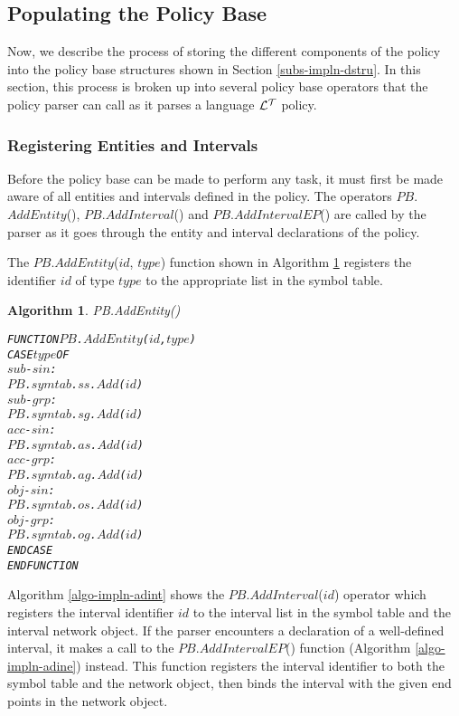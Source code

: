 \documentclass[11pt]{report}
\newenvironment{vverbatim}
{
  \begin{alltt}
}
{
    \vspace{-\baselineskip}
  \end{alltt}
}
\newtheorem{vvalgorithm}{Algorithm}[chapter]
\newenvironment{valgorithm}[2]
{
  \begin{vvalgorithm}{#1}
    \label{#2}
    \small
    \begin{vverbatim}
}
{
    \end{vverbatim}
  \end{vvalgorithm}
}
\begin{document}
      \subsection{Populating the Policy Base}
        \label{subs-impln-poppb}

        Now, we describe the process of storing the different components of the
        policy into the policy base structures shown in Section
        \ref{subs-impln-dstru}. In this section, this process is broken up into
        several policy base operators that the policy parser can call as it
        parses a language ${\cal L^T}$ policy.

        \subsubsection{Registering Entities and Intervals}

          Before the policy base can be made to perform any task, it must first
          be made aware of all entities and intervals defined in the policy.
          The operators $PB$.$AddEntity$(), $PB$.$AddInterval$() and
          $PB$.$AddIntervalEP$() are called by the parser as it goes through
          the entity and interval declarations of the policy.

          The $PB$.$AddEntity$($id$, $type$) function shown in Algorithm
          \ref{algo-impln-adent} registers the identifier $id$ of type $type$
          to the appropriate list in the symbol table.

          \begin{valgorithm}{PB.AddEntity()}{algo-impln-adent}
FUNCTION \(PB\).\(AddEntity\)(\(id\), \(type\))
  CASE \(type\) OF
    \(sub\)-\(sin\) :
      \(PB\).\(symtab\).\(ss\).\(Add\)(\(id\))
    \(sub\)-\(grp\) :
      \(PB\).\(symtab\).\(sg\).\(Add\)(\(id\))
    \(acc\)-\(sin\) :
      \(PB\).\(symtab\).\(as\).\(Add\)(\(id\))
    \(acc\)-\(grp\) :
      \(PB\).\(symtab\).\(ag\).\(Add\)(\(id\))
    \(obj\)-\(sin\) :
      \(PB\).\(symtab\).\(os\).\(Add\)(\(id\))
    \(obj\)-\(grp\) :
      \(PB\).\(symtab\).\(og\).\(Add\)(\(id\))
  ENDCASE
ENDFUNCTION
          \end{valgorithm}

          Algorithm \ref{algo-impln-adint} shows the $PB$.$AddInterval$($id$)
          operator which registers the interval identifier $id$ to the
          interval list in the symbol table and the interval network object.
          If the parser encounters a declaration of a well-defined interval,
          it makes a call to the $PB$.$AddIntervalEP$() function (Algorithm
          \ref{algo-impln-adine}) instead. This function registers the interval
          identifier to both the symbol table and the network object, then
          binds the interval with the given end points in the network object.
\end{document}
